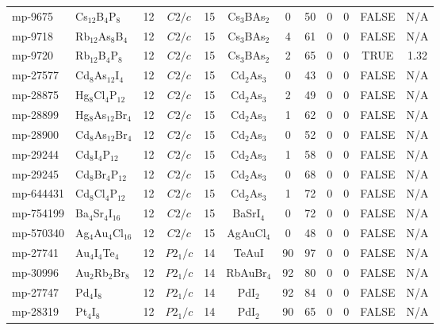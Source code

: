 {\begin{longtable}{llcccccccccc}
    mp-9675 & Cs$_{12}$B$_{4}$P$_{8}$ & 12    & $C2/c$ & 15    & Cs$_{3}$BAs$_{2}$ & 0     & 50    & 0     & 0     & FALSE & N/A \\
    mp-9718 & Rb$_{12}$As$_{8}$B$_{4}$ & 12    & $C2/c$ & 15    & Cs$_{3}$BAs$_{2}$ & 4     & 61    & 0     & 0     & FALSE & N/A \\
    mp-9720 & Rb$_{12}$B$_{4}$P$_{8}$ & 12    & $C2/c$ & 15    & Cs$_{3}$BAs$_{2}$ & 2     & 65    & 0     & 0     & TRUE  & 1.32  \\
    mp-27577 & Cd$_{8}$As$_{12}$I$_{4}$ & 12    & $C2/c$ & 15    & Cd$_{2}$As$_{3}$ & 0     & 43    & 0     & 0     & FALSE & N/A \\
    mp-28875 & Hg$_{8}$Cl$_{4}$P$_{12}$ & 12    & $C2/c$ & 15    & Cd$_{2}$As$_{3}$ & 2     & 49    & 0     & 0     & FALSE & N/A \\
    mp-28899 & Hg$_{8}$As$_{12}$Br$_{4}$ & 12    & $C2/c$ & 15    & Cd$_{2}$As$_{3}$ & 1     & 62    & 0     & 0     & FALSE & N/A \\
    mp-28900 & Cd$_{8}$As$_{12}$Br$_{4}$ & 12    & $C2/c$ & 15    & Cd$_{2}$As$_{3}$ & 0     & 52    & 0     & 0     & FALSE & N/A \\
    mp-29244 & Cd$_{8}$I$_{4}$P$_{12}$ & 12    & $C2/c$ & 15    & Cd$_{2}$As$_{3}$ & 1     & 58    & 0     & 0     & FALSE & N/A \\
    mp-29245 & Cd$_{8}$Br$_{4}$P$_{12}$ & 12    & $C2/c$ & 15    & Cd$_{2}$As$_{3}$ & 0     & 68    & 0     & 0     & FALSE & N/A \\
    mp-644431 & Cd$_{8}$Cl$_{4}$P$_{12}$ & 12    & $C2/c$ & 15    & Cd$_{2}$As$_{3}$ & 1     & 72    & 0     & 0     & FALSE & N/A \\
    mp-754199 & Ba$_{4}$Sr$_{4}$I$_{16}$ & 12    & $C2/c$ & 15    & BaSrI$_{4}$ & 0     & 72    & 0     & 0     & FALSE & N/A \\
    mp-570340 & Ag$_{4}$Au$_{4}$Cl$_{16}$ & 12    & $C2/c$ & 15    & AgAuCl$_{4}$ & 0     & 48    & 0     & 0     & FALSE & N/A \\
    mp-27741 & Au$_{4}$I$_{4}$Te$_{4}$ & 12    & $P2_1/c$ & 14    & TeAuI & 90    & 97    & 0     & 0     & FALSE & N/A \\
    mp-30996 & Au$_{2}$Rb$_{2}$Br$_{8}$ & 12    & $P2_1/c$ & 14    & RbAuBr$_{4}$ & 92    & 80    & 0     & 0     & FALSE & N/A \\
    mp-27747 & Pd$_{4}$I$_{8}$ & 12    & $P2_1/c$ & 14    & PdI$_{2}$ & 92    & 84    & 0     & 0     & FALSE & N/A \\
    mp-28319 & Pt$_{4}$I$_{8}$ & 12    & $P2_1/c$ & 14    & PdI$_{2}$ & 90    & 65    & 0     & 0     & FALSE & N/A \\

\end{longtable}}
